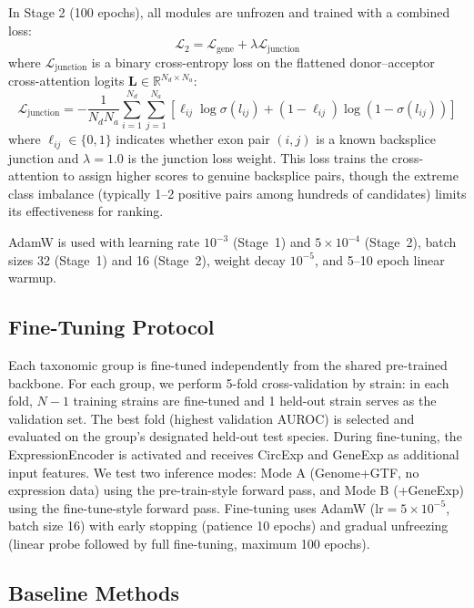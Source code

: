 \documentclass[12pt]{article}
\begin{document}
In Stage 2 (100 epochs), all modules are unfrozen and trained with a combined loss:
\begin{equation}
\mathcal{L}_2 = \mathcal{L}_\text{gene} + \lambda \mathcal{L}_\text{junction}
\end{equation}
where $\mathcal{L}_\text{junction}$ is a binary cross-entropy loss on the flattened donor--acceptor cross-attention logits $\mathbf{L} \in \mathbb{R}^{N_d \times N_a}$:
\begin{equation}
\mathcal{L}_\text{junction} = -\frac{1}{N_d N_a} \sum_{i=1}^{N_d} \sum_{j=1}^{N_a} \left[ \ell_{ij} \log \sigma(l_{ij}) + (1-\ell_{ij}) \log(1-\sigma(l_{ij})) \right]
\end{equation}
where $\ell_{ij} \in \{0, 1\}$ indicates whether exon pair $(i, j)$ is a known backsplice junction and $\lambda = 1.0$ is the junction loss weight. This loss trains the cross-attention to assign higher scores to genuine backsplice pairs, though the extreme class imbalance (typically 1--2 positive pairs among hundreds of candidates) limits its effectiveness for ranking.

AdamW is used with learning rate $10^{-3}$ (Stage~1) and $5 \times 10^{-4}$ (Stage~2), batch sizes 32 (Stage~1) and 16 (Stage~2), weight decay $10^{-5}$, and 5--10 epoch linear warmup.

\subsection{Fine-Tuning Protocol}

Each taxonomic group is fine-tuned independently from the shared pre-trained backbone. For each group, we perform 5-fold cross-validation by strain: in each fold, $N-1$ training strains are fine-tuned and 1 held-out strain serves as the validation set. The best fold (highest validation AUROC) is selected and evaluated on the group's designated held-out test species. During fine-tuning, the ExpressionEncoder is activated and receives CircExp and GeneExp as additional input features. We test two inference modes: Mode A (Genome+GTF, no expression data) using the pre-train-style forward pass, and Mode B (+GeneExp) using the fine-tune-style forward pass. Fine-tuning uses AdamW ($\text{lr} = 5 \times 10^{-5}$, batch size 16) with early stopping (patience 10 epochs) and gradual unfreezing (linear probe followed by full fine-tuning, maximum 100 epochs).

\subsection{Baseline Methods}
\end{document}
